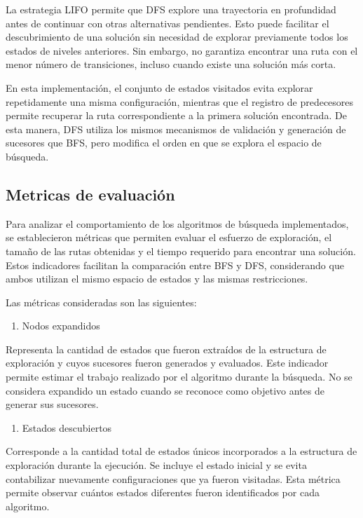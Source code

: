\documentclass[
  spanish,
]{llncs}
\providecommand{\tightlist}{%
  \setlength{\itemsep}{0pt}\setlength{\parskip}{0pt}}
\begin{document}
La estrategia LIFO permite que DFS explore una trayectoria en
profundidad antes de continuar con otras alternativas pendientes. Esto
puede facilitar el descubrimiento de una solución sin necesidad de
explorar previamente todos los estados de niveles anteriores. Sin
embargo, no garantiza encontrar una ruta con el menor número de
transiciones, incluso cuando existe una solución más corta.

En esta implementación, el conjunto de estados visitados evita explorar
repetidamente una misma configuración, mientras que el registro de
predecesores permite recuperar la ruta correspondiente a la primera
solución encontrada. De esta manera, DFS utiliza los mismos mecanismos
de validación y generación de sucesores que BFS, pero modifica el orden
en que se explora el espacio de búsqueda.

\subsection{Metricas de evaluación}\label{metricas-de-evaluaciuxf3n}

Para analizar el comportamiento de los algoritmos de búsqueda
implementados, se establecieron métricas que permiten evaluar el
esfuerzo de exploración, el tamaño de las rutas obtenidas y el tiempo
requerido para encontrar una solución. Estos indicadores facilitan la
comparación entre BFS y DFS, considerando que ambos utilizan el mismo
espacio de estados y las mismas restricciones.

Las métricas consideradas son las siguientes:

\begin{enumerate}
\def\labelenumi{\arabic{enumi}.}
\tightlist
\item
  Nodos expandidos
\end{enumerate}

Representa la cantidad de estados que fueron extraídos de la estructura
de exploración y cuyos sucesores fueron generados y evaluados. Este
indicador permite estimar el trabajo realizado por el algoritmo durante
la búsqueda. No se considera expandido un estado cuando se reconoce como
objetivo antes de generar sus sucesores.

\begin{enumerate}
\def\labelenumi{\arabic{enumi}.}
\setcounter{enumi}{1}
\tightlist
\item
  Estados descubiertos
\end{enumerate}

Corresponde a la cantidad total de estados únicos incorporados a la
estructura de exploración durante la ejecución. Se incluye el estado
inicial y se evita contabilizar nuevamente configuraciones que ya fueron
visitadas. Esta métrica permite observar cuántos estados diferentes
fueron identificados por cada algoritmo.
\end{document}
